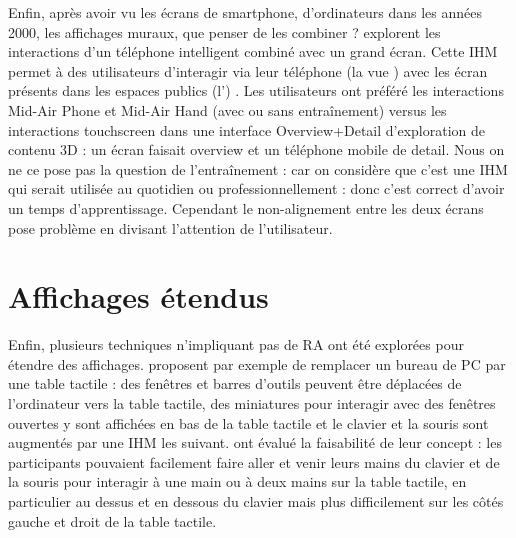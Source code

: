 Enfin, après avoir vu les écrans de smartphone, d'ordinateurs dans les années 2000, les affichages muraux, que penser de les combiner ?
\cite{Berge2014} explorent les interactions d'un téléphone intelligent combiné avec un grand écran. Cette IHM  permet à des utilisateurs d'interagir via leur téléphone (la vue ) avec les écran présents dans les espaces publics (l') . 
Les utilisateurs ont préféré les interactions Mid-Air Phone et Mid-Air Hand (avec ou sans entraînement) versus les interactions touchscreen dans une interface Overview+Detail d'exploration de contenu 3D : un écran faisait overview et un téléphone mobile de detail.
Nous on ne ce pose pas la question de l'entraînement : car on considère que c'est une IHM qui serait utilisée au quotidien ou professionnellement : donc c'est correct d'avoir un temps d'apprentissage.
Cependant le non-alignement entre les deux écrans pose problème en divisant l'attention de l'utilisateur.



\section{Affichages étendus}
\label{sec:litterature_extended_displays}
Enfin, plusieurs techniques n'impliquant pas de RA ont été explorées pour étendre des affichages. \cite{Bi2011} proposent par exemple de remplacer un bureau de PC par une table tactile  : des fenêtres et barres d'outils peuvent être déplacées de l'ordinateur vers la table tactile, des miniatures pour interagir avec des fenêtres ouvertes y sont affichées en bas de la table tactile et le clavier et la souris sont augmentés par une IHM les suivant. \citeauthor{Bi2011} ont évalué la faisabilité de leur concept : les participants pouvaient facilement faire aller et venir leurs mains du clavier et de la souris pour interagir à une main ou à deux mains sur la table tactile, en particulier au dessus et en dessous du clavier mais plus difficilement sur les côtés gauche et droit de la table tactile.

